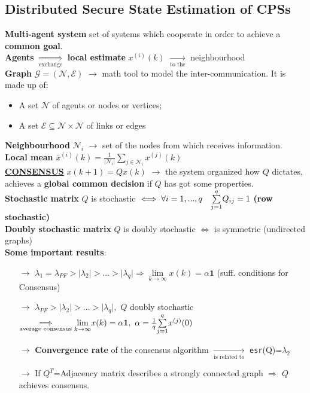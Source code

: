 \documentclass[a4paper, 12pt]{article}
\begin{document}
{\color{red} \subsection*{Distributed Secure State Estimation of CPSs \quad{}}} 

\noindent
\textbf{Multi-agent system} set of systems which cooperate in order to achieve a \textbf{common goal}.\\
\textbf{Agents} $\underset{\text{exchange}}{\Longrightarrow}$ \textbf{local estimate} $x^{(i)}(k)$ $\underset{\text{to the}}{\longrightarrow}$ neighbourhood\\
\textbf{Graph} $\mathcal{G}=(\mathcal{N},\mathcal{E})$ $\rightarrow$ math tool to model the inter-communication. It is made up of:
\begin{itemize}
    \itemsep-0.3em
    \item A set $\mathcal{N}$ of agents or nodes or vertices; 
    \item A set $\mathcal{E}\subseteq\mathcal{N}\times\mathcal{N}$ of links or edges
\end{itemize}
\vspace{-0.4em}
\textbf{Neighbourhood} $\mathcal{N}_i$ $\rightarrow$ set of the nodes from which receives information.\\
\textbf{Local mean} {\normalsize{$\bar{x}^{(i)}(k)=\frac{1}{\vert \mathcal{N}_i \vert} \underset{j\in\mathcal{N}_i}{\sum}{x^{(j)}(k)}$}}\\
\underline{\large\textbf{CONSENSUS}} {\large{$x(k+1)=Qx(k)$}} $\longrightarrow$ the system organized how $Q$ dictates, achieves a \textbf{global common decision} if $Q$ has got some properties.\\
\textbf{Stochastic matrix} $Q$ is stochastic $\iff \forall i=1,...,q \quad \overunderset{q}{j=1}{\sum} Q_{ij}=1$ \textbf{(row stochastic)}\\
\textbf{Doubly stochastic matrix} $Q$ is doubly stochastic $\iff$ is symmetric (undirected graphs)\\
\textbf{Some important results}:
\vspace{-0.2cm}
\begin{itemize}
    \itemsep-0.3em
    \item[$\longrightarrow$] $\lambda_1=\lambda_{PF} > \vert \lambda_2 \vert > ... > \vert \lambda_q \vert \Longrightarrow \underset{k\to\infty}{\lim} x(k)=\alpha\mathbf{1}$ (suff. conditions for Consensus)  
    \item[$\longrightarrow$]  $\lambda_{PF} > \vert \lambda_2 \vert > ... > \vert \lambda_q \vert, $ $Q$ doubly stochastic $ \underset{\text{average 
    consensus}}{\Longrightarrow} \underset{k\to\infty}{\lim} x(k)=\alpha\mathbf{1}, \ \alpha=\frac{1}{q}\overunderset{q}{j=1}{\sum}x^{(j)}(0)$  
    \item[$\longrightarrow$] \textbf{Convergence rate} of the consensus algorithm  $\underset{\text{is related to}}{\longrightarrow}$ \texttt{esr}(Q)=$\lambda_2$ 
    \item[$\longrightarrow$] If $Q^T$=Adjacency matrix describes a strongly connected graph $\Longrightarrow$ $Q$ achieves consensus.
\end{itemize}
\end{document}
